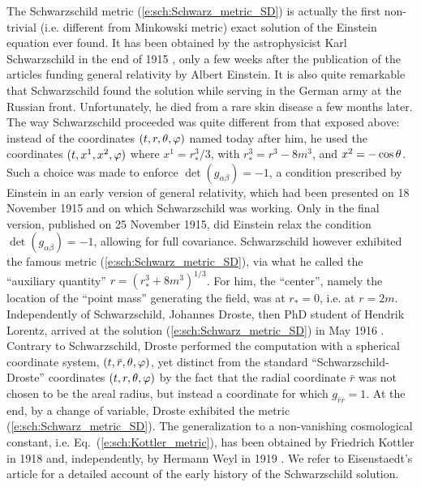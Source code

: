 \begin{hist} \label{h:sch:Schwarzschild_sol}
The Schwarzschild metric (\ref{e:sch:Schwarz_metric_SD}) is actually
the first non-trivial (i.e. different from Minkowski metric) exact solution
of the Einstein equation ever found. It has been obtained by the
astrophysicist Karl Schwarzschild in the end of 1915 \cite{Schwa1916}, only a few weeks
after the publication of the articles funding general relativity by
Albert Einstein. It is also quite remarkable that
Schwarzschild found the solution while serving in the German army at the Russian
front. Unfortunately, he died from a rare skin disease a few months later.
The way Schwarzschild proceeded was quite different from that exposed above:
instead of the coordinates $(t,r,\theta,\varphi)$
named today after him, he used the coordinates
$(t,x^1,x^2,\varphi)$ where $x^1 = r_*^3/3$, with $r_*^3 = r^3-8m^3$, and
$x^2 = -\cos\theta$. Such a choice was made to enforce $\det(g_{\alpha\beta}) = -1$, a condition
prescribed by Einstein in an early version of general relativity, which had been presented on
18 November 1915 and on which Schwarzschild was working. Only in the final version, published on
25 November 1915, did Einstein relax the condition $\det(g_{\alpha\beta}) = -1$, allowing for full
covariance. Schwarzschild however
exhibited the famous metric (\ref{e:sch:Schwarz_metric_SD}), via what he
called the ``auxiliary quantity'' $r = (r_*^3 + 8m^3)^{1/3}$.
For him, the ``center'',  namely the location of the ``point mass'' generating the field,
was at $r_* = 0$, i.e. at $r=2m$.
Independently of Schwarzschild, Johannes Droste, then PhD student of
Hendrik Lorentz,
arrived at the solution (\ref{e:sch:Schwarz_metric_SD}) in May 1916 \cite{Drost1917}.
Contrary to Schwarzschild, Droste performed the computation with
a spherical coordinate system, $(t,\bar r, \theta,\varphi)$, yet distinct from
the standard ``Schwarzschild-Droste'' coordinates $(t,r,\theta,\varphi)$ by the fact that the radial
coordinate $\bar r$ was not chosen to be the areal radius, but instead a
coordinate for which $g_{\bar r\bar r} = 1$. At the end, by a change of
variable, Droste exhibited the metric (\ref{e:sch:Schwarz_metric_SD}).
The generalization to a non-vanishing cosmological constant, i.e.
Eq.~(\ref{e:sch:Kottler_metric}), has been obtained by
Friedrich Kottler in 1918 \cite{Kottl1918} and, independently, by
Hermann Weyl in 1919 \cite{Weyl1919}. We refer to Eisenstaedt's article
\cite{Eisen82} for a detailed account of the early history of the
Schwarzschild solution.
\end{hist}


